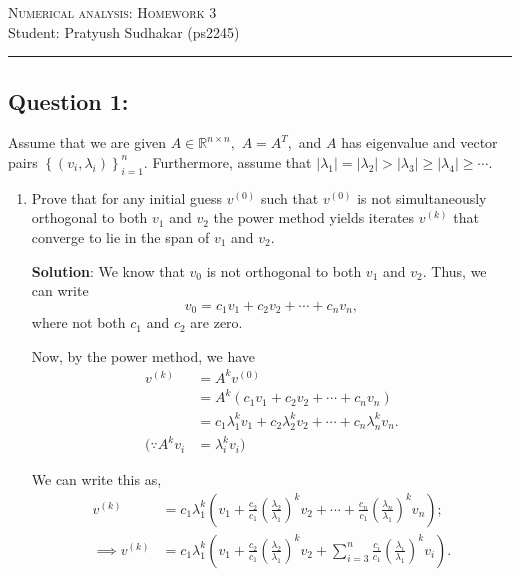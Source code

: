 \documentclass[11pt,onecolumn]{article}
\begin{document}
\noindent
\textsc{\Large Numerical analysis: Homework 3}\\
Student: Pratyush Sudhakar (ps2245)\\
\hrule
\noindent

\subsection*{Question 1:}
Assume that we are given $A\in\mathbb{R}^{n\times n},$ $A=A^T,$ and $A$ has eigenvalue and vector pairs $\left\{(v_i,\lambda_i)\right\}_{i=1}^n.$ Furthermore, assume that $\lvert\lambda_1\rvert = \lvert\lambda_2\rvert > \lvert \lambda_3\rvert \geq \lvert\lambda_4\rvert \geq \cdots.$

\begin{enumerate}[label=(\alph*)]
	\item Prove that for any initial guess $v^{(0)}$ such that $v^{(0)}$ is not simultaneously orthogonal to both $v_1$ and $v_2$ the power method yields iterates $v^{(k)}$ that converge to lie in the span of $v_1$ and $v_2.$

	      \textbf{Solution}:
	      We know that $v_0$ is not orthogonal to both $v_1$ and $v_2$. Thus, we can write $$v_0 = c_1v_1 + c_2v_2 + \cdots + c_nv_n,$$ where not both $c_1$ and $c_2$ are zero.

	      Now, by the power method, we have
	      \begin{align*}
		      v^{(k)}          & = A^kv^{(0)}                                                          \\
		                       & = A^k(c_1v_1 + c_2v_2 + \cdots + c_nv_n)                              \\
		                       & = c_1\lambda_1^kv_1 + c_2\lambda_2^kv_2 + \cdots + c_n\lambda_n^kv_n. \\
		      (\because A^kv_i & = \lambda_i^kv_i)
	      \end{align*}

	      We can write this as,
	      \begin{align*}
		      v^{(k)}          & = c_1\lambda_1^k\left(v_1 + \frac{c_2}{c_1}\left(\frac{\lambda_2}{\lambda_1}\right)^kv_2 + \cdots + \frac{c_n}{c_1}\left(\frac{\lambda_n}{\lambda_1}\right)^kv_n\right);      \\
		      \implies v^{(k)} & = c_1\lambda_1^k\left(v_1 + \frac{c_2}{c_1}\left(\frac{\lambda_2}{\lambda_1}\right)^kv_2 + \sum_{i=3}^{n}\frac{c_i}{c_1}\left(\frac{\lambda_i}{\lambda_1}\right)^kv_i\right).
	      \end{align*}


\end{enumerate}
\end{document}
